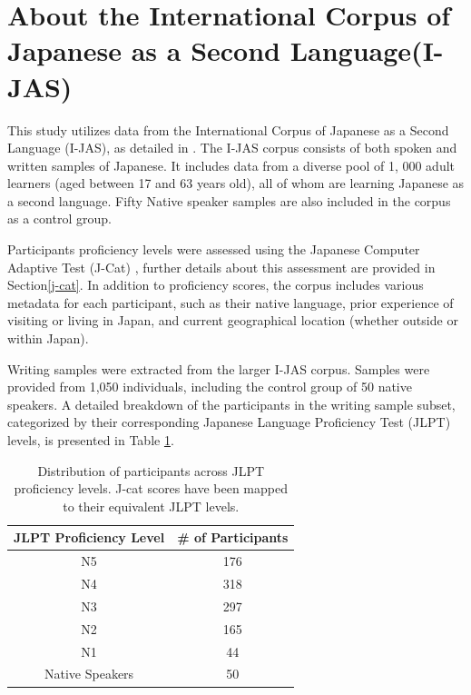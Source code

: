 \section{About the International Corpus of Japanese as a Second Language(I-JAS)}

This study utilizes data from the International Corpus of Japanese as a Second Language (I-JAS), as
detailed in
\citet{Sakoda2020}.  The
I-JAS corpus consists of both spoken and written samples of Japanese.  It includes data from a diverse pool of 1,
000 adult learners
(aged
between 17 and 63 years old), all of whom are learning Japanese as a second language. Fifty Native speaker samples are
also
included in the corpus as a control group.

Participants proficiency levels were assessed using the Japanese Computer Adaptive Test (J-Cat)
\citep{Imai2009},  further details about this assessment are provided in
Section\ref{j-cat}. In addition to proficiency scores, the corpus includes various metadata for each participant,
such as
their
native language,
prior experience of visiting or living in Japan, and current geographical location (whether outside or within Japan).

Writing samples were extracted from the larger I-JAS corpus. Samples  were provided from 1,050 individuals,
including the
control group
of 50 native speakers. A detailed breakdown of the participants in the writing sample subset, categorized by
their corresponding Japanese Language Proficiency Test (JLPT) levels, is presented in Table
\ref{tab:participants-chart}.

\begin{table}[h!]
\centering
\begin{tabular}{cc}
\hline \textbf{JLPT Proficiency Level} & \textbf{\# of Participants} \\ \hline
N5 & 176 \\
N4  & 318 \\
N3 & 297\\
N2 & 165 \\
N1 & 44 \\
Native Speakers & 50 \\
\hline
\end{tabular}
\caption[Distribution of participants across JLPT proficiency levels]{Distribution of participants across JLPT proficiency levels. J-cat scores have been mapped to their
equivalent JLPT levels. }
\label{tab:participants-chart}
\end{table}

